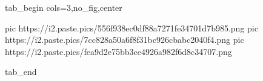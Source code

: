  
 
 
 
 


\ifcmt
  tab_begin cols=3,no_fig,center

     pic https://i2.paste.pics/556f938ec0df88a7271fe34701d7b985.png
		 pic https://i2.paste.pics/7cc828a50a6f8f31bc926cbabc2040f4.png
		 pic https://i2.paste.pics/fea9d2e75bb3ce4926a982f6d8c34707.png

  tab_end
\fi
